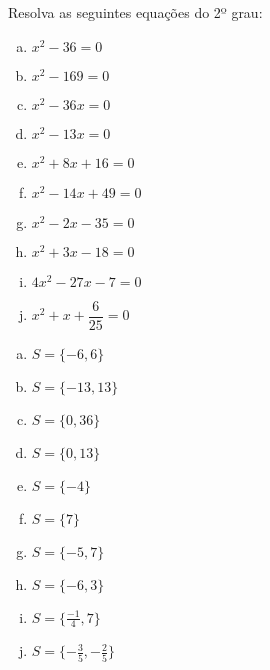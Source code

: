 \begin{secExercicios}
\begin{exer}
Resolva as seguintes equações do 2º grau:

\begin{multicols}{2}
\begin{enumerate}[a)]
\item $x^2 - 36=0$
\item $x^2 - 169=0$
\item $x^2 - 36x=0$
\item $x^2 - 13x=0$
\item $x^2 + 8x + 16=0$
\item $x^2 - 14x + 49=0$
\item $x^2 - 2x - 35=0$
\item $x^2 + 3x - 18=0$
\item $4x^2 - 27x - 7=0$
\item $x^2 + x + \dfrac{6}{25}=0$
\end{enumerate}
\end{multicols}
\end{exer}
\begin{resp}
\begin{multicols}{3}
\begin{enumerate}[a)]
\item $S= \{-6, 6 \}$
\item $S= \{ -13, 13\}$
\item $S= \{ 0, 36\} $
\item $S= \{0, 13 \} $
\item $S= \{ -4 \} $
\item $S= \{ 7 \} $
\item $S= \{ -5, 7 \} $
\item $S= \{ -6, 3 \} $
\item $S= \{ \frac{-1}{4}, 7\} $
\item $S= \{ -\frac{3}{5}, -\frac{2}{5} \} $
\end{enumerate}
\end{multicols}
\end{resp}



\end{secExercicios}
